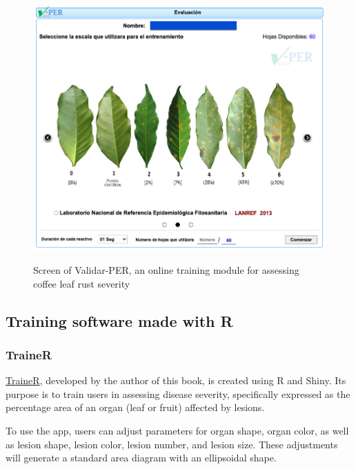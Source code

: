 \documentclass[
  letterpaper,
  DIV=11,
  numbers=noendperiod]{scrreprt}
\begin{document}
\begin{figure}

{\centering 

\href{http://royacafe.lanref.org.mx/ValidarPer/app/index.php}{\includegraphics[width=4.47917in,height=\textheight]{imgs/validar-per.png}}

}

\caption{\label{fig-validar}Screen of Validar-PER, an online training
module for assessing coffee leaf rust severity}

\end{figure}

\hypertarget{training-software-made-with-r}{%
\subsection{Training software made with
R}\label{training-software-made-with-r}}

\hypertarget{trainer}{%
\subsubsection{TraineR}\label{trainer}}

\href{https://edelponte.shinyapps.io/traineR/}{TraineR}, developed by
the author of this book, is created using R and Shiny. Its purpose is to
train users in assessing disease severity, specifically expressed as the
percentage area of an organ (leaf or fruit) affected by lesions.

To use the app, users can adjust parameters for organ shape, organ
color, as well as lesion shape, lesion color, lesion number, and lesion
size. These adjustments will generate a standard area diagram with an
ellipsoidal shape.
\end{document}
